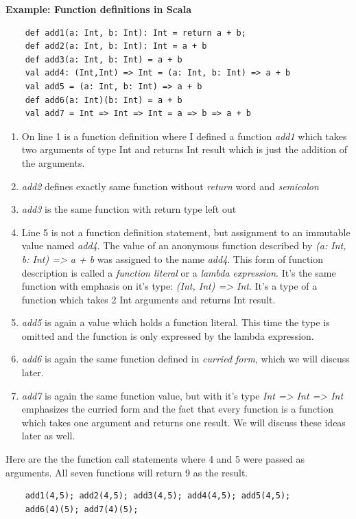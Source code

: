 \documentclass[12pt,twoside,a4paper]{report}
\begin{document}
\textbf{Example: Function definitions in Scala}
\begin{lstlisting}
	def add1(a: Int, b: Int): Int = return a + b;
	def add2(a: Int, b: Int): Int = a + b
	def add3(a: Int, b: Int) = a + b
	val add4: (Int,Int) => Int = (a: Int, b: Int) => a + b
	val add5 = (a: Int, b: Int) => a + b
	def add6(a: Int)(b: Int) = a + b
	val add7 = Int => Int => Int = a => b => a + b
\end{lstlisting}

\begin{enumerate}
\item On line 1 is a function definition where I defined a function \emph{add1} which takes two arguments of type Int and returns Int result which is just the addition of the arguments.
\item \emph{add2} defines exactly same function without \emph{return} word and \emph{semicolon}
\item \emph{add3} is the same function with return type left out
\item Line 5 is not a function definition statement, but assignment to an  
immutable value named \emph{add4}. The value of an anonymous function described by \emph{(a: Int, b: Int) => a + b} was assigned to the name \emph{add4}. This form of function description is called a \emph{function literal} or a \emph{lambda expression}. It's the same function with emphasis on it's type: \emph{(Int, Int) => Int}. It's a type of a function which takes 2 Int arguments and returns Int result. 
\item \emph{add5} is again a value which holds a function literal. This time the type is omitted and the function is only expressed by the lambda expression.
\item \emph{add6} is again the same function defined in \emph{curried form}, which we will discuss later.
\item \emph{add7} is again the same function value, but with it's type \emph{Int => Int => Int} emphasizes the curried form and the fact that every function is a function which takes one argument and returns one result. We will discuss these ideas later as well.
\end{enumerate}

Here are the the function call statements where 4 and 5 were passed as arguments. All seven functions will return 9 as the result. 
\begin{lstlisting}
	add1(4,5); add2(4,5); add3(4,5); add4(4,5);	add5(4,5); 
	add6(4)(5);	add7(4)(5);
\end{lstlisting}
\end{document}
